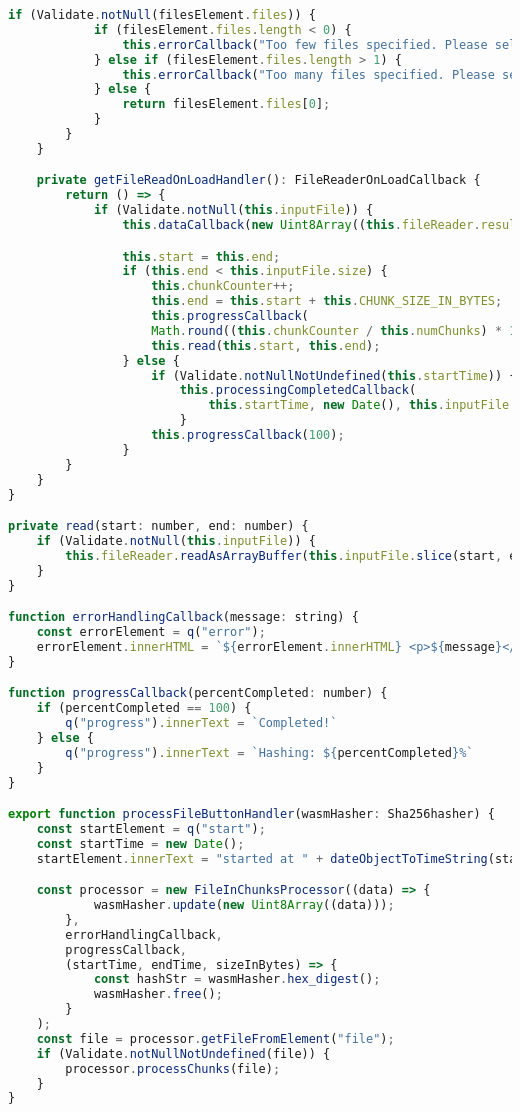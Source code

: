 \begin{lstlisting}[language=Javascript]
        if (Validate.notNull(filesElement.files)) {
            if (filesElement.files.length < 0) {
                this.errorCallback("Too few files specified. Please select one file.")
            } else if (filesElement.files.length > 1) {
                this.errorCallback("Too many files specified. Please select one file.")
            } else {
                return filesElement.files[0];
            }
        }
    }

    private getFileReadOnLoadHandler(): FileReaderOnLoadCallback {
        return () => {
            if (Validate.notNull(this.inputFile)) {
                this.dataCallback(new Uint8Array((this.fileReader.result as ArrayBuffer)));

                this.start = this.end;
                if (this.end < this.inputFile.size) {
                    this.chunkCounter++;
                    this.end = this.start + this.CHUNK_SIZE_IN_BYTES;
                    this.progressCallback(
                    Math.round((this.chunkCounter / this.numChunks) * 100));
                    this.read(this.start, this.end);
                } else {
                    if (Validate.notNullNotUndefined(this.startTime)) {
                        this.processingCompletedCallback(
                            this.startTime, new Date(), this.inputFile.size);
                        }
                    this.progressCallback(100);
                }
        }
    }
}

private read(start: number, end: number) {
    if (Validate.notNull(this.inputFile)) {
        this.fileReader.readAsArrayBuffer(this.inputFile.slice(start, end));
    }
}

function errorHandlingCallback(message: string) {
    const errorElement = q("error");
    errorElement.innerHTML = `${errorElement.innerHTML} <p>${message}</p>`;
}

function progressCallback(percentCompleted: number) {
    if (percentCompleted == 100) {
        q("progress").innerText = `Completed!`
    } else {
        q("progress").innerText = `Hashing: ${percentCompleted}%`
    }
}

export function processFileButtonHandler(wasmHasher: Sha256hasher) {
    const startElement = q("start");
    const startTime = new Date();
    startElement.innerText = "started at " + dateObjectToTimeString(startTime);

    const processor = new FileInChunksProcessor((data) => {
            wasmHasher.update(new Uint8Array((data)));
        },
        errorHandlingCallback,
        progressCallback,
        (startTime, endTime, sizeInBytes) => {
            const hashStr = wasmHasher.hex_digest();
            wasmHasher.free();
        }
    );
    const file = processor.getFileFromElement("file");
    if (Validate.notNullNotUndefined(file)) {
        processor.processChunks(file);
    }
}
\end{lstlisting}
